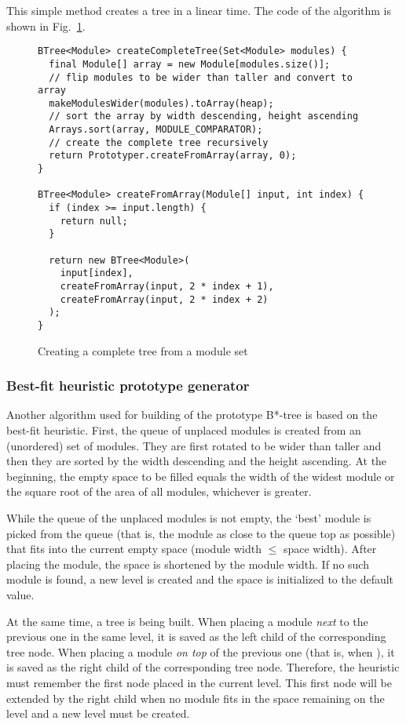 This simple method creates a tree in a linear time. The code of the algorithm is shown in Fig.~\ref{alg:complete}.

\begin{figure}
\centering
\begin{lstlisting}
BTree<Module> createCompleteTree(Set<Module> modules) {
  final Module[] array = new Module[modules.size()];
  // flip modules to be wider than taller and convert to array
  makeModulesWider(modules).toArray(heap);
  // sort the array by width descending, height ascending
  Arrays.sort(array, MODULE_COMPARATOR);
  // create the complete tree recursively
  return Prototyper.createFromArray(array, 0);
}
  
BTree<Module> createFromArray(Module[] input, int index) {
  if (index >= input.length) {
    return null;
  }
    
  return new BTree<Module>(
    input[index],
    createFromArray(input, 2 * index + 1),
    createFromArray(input, 2 * index + 2)
  );
}
\end{lstlisting}
\caption{Creating a complete tree from a module set}
\label{alg:complete}
\end{figure}

\subsubsection{Best-fit heuristic prototype generator}

Another algorithm used for building of the prototype B*-tree is based on the best-fit heuristic. First, the queue of unplaced modules is created from an (unordered) set of modules. They are first rotated to be wider than taller and then they are sorted by the width descending and the height ascending. At the beginning, the empty space to be filled equals the width of the widest module or the square root of the area of all modules, whichever is greater.

While the queue of the unplaced modules is not empty, the `best' module is picked from the queue (that is, the module as close to the queue top as possible) that fits into the current empty space (module width $\leq$ space width). After placing the module, the space is shortened by the module width. If no such module is found, a new level is created and the space is initialized to the default value.

At the same time, a tree is being built. When placing a module {\em next} to the previous one in the same level, it is saved as the left child of the corresponding tree node. When placing a module {\em on top} of the previous one (that is, when ), it is saved as the right child of the corresponding tree node. Therefore, the heuristic must remember the first node placed in the current level. This first node will be extended by the right child when no module fits in the space remaining on the level and a new level must be created. 

